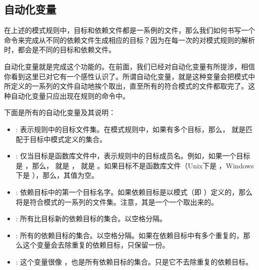 \documentclass[a4paper,10pt]{sphinxmanual}
\begin{document}
\subsection{自动化变量}
\label{\detokenize{implicit_rules:id11}}
在上述的模式规则中，目标和依赖文件都是一系例的文件，那么我们如何书写一个命令来完成从不同的依赖文件生成相应的目标？因为在每一次的对模式规则的解析时，都会是不同的目标和依赖文件。

自动化变量就是完成这个功能的。在前面，我们已经对自动化变量有所提涉，相信你看到这里已对它有一个感性认识了。所谓自动化变量，就是这种变量会把模式中所定义的一系列的文件自动地挨个取出，直至所有的符合模式的文件都取完了。这种自动化变量只应出现在规则的命令中。

下面是所有的自动化变量及其说明：
\begin{itemize}
\item {} 
 : 表示规则中的目标文件集。在模式规则中，如果有多个目标，那么，  就是匹配于目标中模式定义的集合。

\item {} 
\sphinxcode{\sphinxupquote{\$\%}} : 仅当目标是函数库文件中，表示规则中的目标成员名。例如，如果一个目标是  ，那么， \sphinxcode{\sphinxupquote{\$\%}} 就是  ，  就是  。如果目标不是函数库文件（Unix下是  ，Windows下是  ），那么，其值为空。

\item {} 
\sphinxcode{\sphinxupquote{\$\textless{}}} : 依赖目标中的第一个目标名字。如果依赖目标是以模式（即 \sphinxcode{\sphinxupquote{\%}} ）定义的，那么 \sphinxcode{\sphinxupquote{\$\textless{}}}
将是符合模式的一系列的文件集。注意，其是一个一个取出来的。

\item {} 
 : 所有比目标新的依赖目标的集合。以空格分隔。

\item {} 
\sphinxcode{\sphinxupquote{\$\textasciicircum{}}} : 所有的依赖目标的集合。以空格分隔。如果在依赖目标中有多个重复的，那么这个变量会去除重复的依赖目标，只保留一份。

\item {} 
\sphinxcode{\sphinxupquote{\$+}} : 这个变量很像 \sphinxcode{\sphinxupquote{\$\textasciicircum{}}} ，也是所有依赖目标的集合。只是它不去除重复的依赖目标。


\end{itemize}
\end{document}
